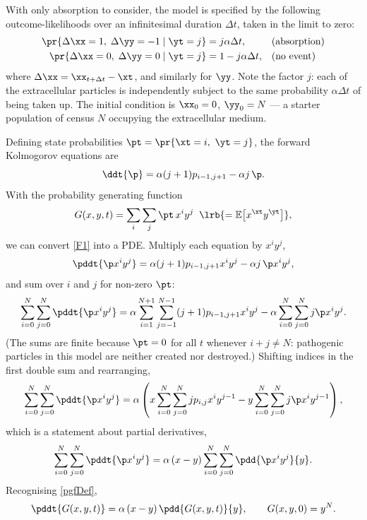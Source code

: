 With only absorption to consider, the model is specified by the following
outcome-likelihoods over an infinitesimal duration $\Delta t$, taken in the limit to
zero:
\begin{align*}
     \pr{\Delta\xx= 1,\;\Delta\yy = -1 \;|\; \yt = j} &= j \alpha \Delta t,  &&\text{(absorption)}\\
     \pr{\Delta\xx= 0,\;\Delta\yy = 0 \;|\; \yt = j} &= 1 -  j \alpha \Delta t,  &&\text{(no event)}
\end{align*}
where $\Delta\xx = \xx_{t+\Delta t}-\xt$, and similarly for $\yy$. Note the factor $j$:
each of the extracellular particles is independently subject to the same probability
$\alpha\Delta t$ of being taken up. The initial condition is $\xx_0 = 0$, $\yy_0 = N$ ---
a starter population of census $N$ occupying the extracellular medium.

Defining state probabilities $\pt = \pr{\xt=i,\ \yt=j}$, the forward Kolmogorov equations
are
\begin{equation}
\label{F1}
\ddt{\p} = \alpha(j+1)p_{i-1,j+1} - \alpha j\,\p .
\end{equation}
With the probability generating function
\begin{equation}
\label{pgfDef}
G(x,y,t) = \sum_i\sum_j \pt\, x^iy^j
\;\;\lrb{=\mathbb{E}\bigl[x^{\xt}y^{\yt}\bigr]},
\end{equation}
we can convert \cref{F1} into a PDE. Multiply each equation by $x^iy^j$,
\begin{equation*}
\pddt{\p x^iy^j} = \alpha(j+1)p_{i-1,j+1}x^iy^j - \alpha j\,\p x^iy^j ,
\end{equation*}
and sum over $i$ and $j$ for non-zero $\pt$:
\begin{equation}
\label{pdeDere2}
\sum_{i = 0}^N\sum_{j=0}^N\pddt{\p x^iy^j} = \alpha\sum_{i = 1}^{N+1}\sum_{j=-1}^{N-1}(j + 1) p_{i-1,j+1}x^iy^j - \alpha \sum_{i = 0}^N\sum_{j=0}^Nj \p x^iy^j.
\end{equation}
(The sums are finite because $\pt=0$ for all $t$ whenever $i+j\neq N$: pathogenic
particles in this model are neither created nor destroyed.) Shifting indices in the
first double sum and rearranging,
\begin{equation*}
\sum_{i = 0}^N\sum_{j=0}^N\pddt{\p x^iy^j} = \alpha\left(x\sum_{i = 0}^N\sum_{j=0}^N j p_{i,j}x^{i}y^{j-1} -  y\sum_{i = 0}^N\sum_{j=0}^Nj \p x^iy^{j-1} \right),
\end{equation*}
which is a statement about partial derivatives,
\begin{equation*}
\sum_{i = 0}^N\sum_{j=0}^N\pddt{\p x^iy^j} = \alpha\left(x - y\right)\sum_{i = 0}^N\sum_{j=0}^N \pdd{\p x^iy^j}{y}.
\end{equation*}
Recognising \cref{pgfDef},
\begin{equation}
\label{PDE1}
\pddt{G(x,y,t)} = \alpha\left(x - y\right) \pdd{G(x,y,t)}{y},
\qquad G(x,y,0) = y^N .
\end{equation}

